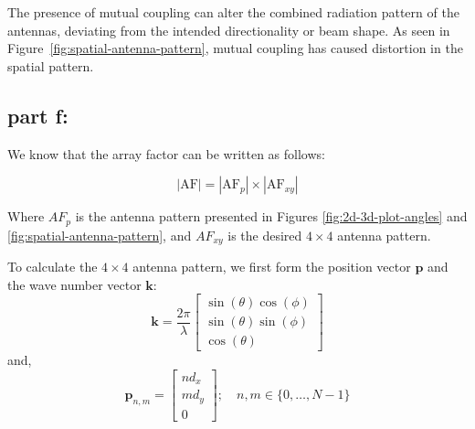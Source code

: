 \documentclass[12pt,onecolumn,a4paper]{article}
\begin{document}
	The presence of mutual coupling can alter the combined radiation pattern of the antennas, deviating from the intended directionality or beam shape.
	As seen in Figure~\ref{fig:spatial-antenna-pattern}, mutual coupling has caused distortion in the spatial pattern.
	\FloatBarrier
	\subsection{part f:}
	
	We know that the array factor can be written as follows:
	
	\begin{equation}
		|\text{AF}| = |\text{AF}_p| \times |\text{AF}_{xy}|
	\end{equation}
	
	Where $AF_p$ is the antenna pattern presented in Figures \ref{fig:2d-3d-plot-angles} and \ref{fig:spatial-antenna-pattern}, and $AF_{xy}$ is the desired $4\times4$ antenna pattern.
	
	To calculate the $4\times4$ antenna pattern, we first form the position vector $\bm{p}$ and the wave number vector $\bm{k}$:
	\begin{equation}
		\bm{k} = \frac{2\pi}{\lambda} 
		\begin{bmatrix}
			\sin(\theta) \cos(\phi) \\
			\sin(\theta) \sin(\phi) \\
			\cos(\theta)
		\end{bmatrix}
	\end{equation}
	and,
	\begin{equation}
		\bm{p}_{n,m} = 
		\begin{bmatrix}
			n d_x \\
			m d_y \\
			0
		\end{bmatrix}
		; \quad n, m \in \big\{  0, \ldots, N - 1 \big\}
	\end{equation}
	
\end{document}
